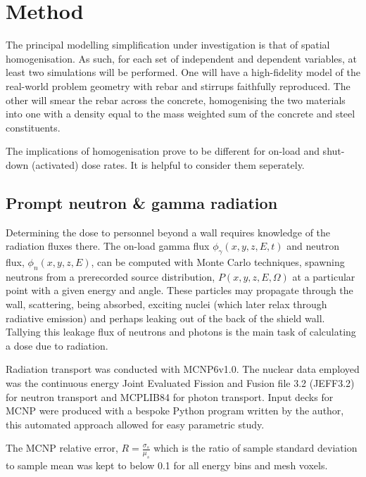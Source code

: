 \section{Method}

The principal modelling simplification under investigation is that of spatial homogenisation. As such, for each set of independent and dependent variables, at least two simulations will be performed. One will have a high-fidelity model of the real-world problem geometry with rebar and stirrups faithfully reproduced. The other will smear the rebar across the concrete, homogenising the two materials into one with a density equal to the mass weighted sum of the concrete and steel constituents. \par
The implications of homogenisation prove to be different for on-load and shut-down (activated) dose rates. It is helpful to consider them seperately.

\subsection{Prompt neutron \& gamma radiation}

Determining the dose to personnel beyond a wall requires knowledge of the radiation fluxes there. The on-load gamma flux $\phi_{\gamma}(x,y,z,E,t)$ and neutron flux, $\phi_{n}(x,y,z,E)$, can be computed with Monte Carlo techniques, spawning neutrons from a prerecorded source distribution, $P(x,y,z,E,\Omega)$ at a particular point with a given energy and angle. These particles may propagate through the wall, scattering, being absorbed, exciting nuclei (which later relax through radiative emission) and perhaps leaking out of the back of the shield wall. Tallying this leakage flux of neutrons and photons is the main task of calculating a dose due to radiation.\par
Radiation transport was conducted with MCNP6v1.0. The nuclear data employed was the continuous energy Joint Evaluated Fission and Fusion file 3.2 (JEFF3.2) for neutron transport and MCPLIB84 for photon transport. Input decks for MCNP were produced with a bespoke Python program written by the author, this automated approach allowed for easy parametric study. \par
The MCNP relative error, $R = \frac{\sigma_{s}}{\mu_{s}}$ which is the ratio of sample standard deviation to sample mean was kept to below 0.1 for all energy bins and mesh voxels.

